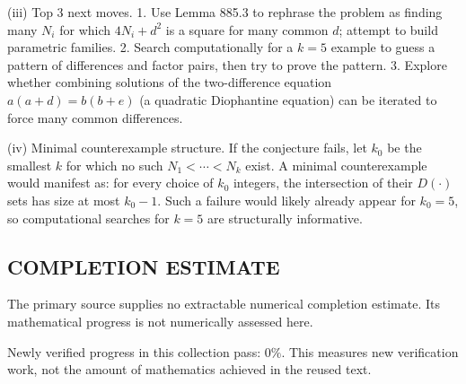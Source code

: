 (iii) Top 3 next moves.
1. Use Lemma 885.3 to rephrase the problem as finding many $N_i$ for which $4N_i+d^2$ is a square for many common $d$; attempt to build parametric families.
2. Search computationally for a $k=5$ example to guess a pattern of differences and factor pairs, then try to prove the pattern.
3. Explore whether combining solutions of the two-difference equation $a(a+d)=b(b+e)$ (a quadratic Diophantine equation) can be iterated to force many common differences.

(iv) Minimal counterexample structure.
If the conjecture fails, let $k_0$ be the smallest $k$ for which no such $N_1<\cdots<N_k$ exist. A minimal counterexample would manifest as: for every choice of $k_0$ integers, the intersection of their $D(\cdot)$ sets has size at most $k_0-1$. Such a failure would likely already appear for $k_0=5$, so computational searches for $k=5$ are structurally informative.




\subsection*{COMPLETION ESTIMATE}
The primary source supplies no extractable numerical completion estimate. Its mathematical progress is not numerically assessed here.

Newly verified progress in this collection pass: $0\%$. This measures new verification work, not the amount of mathematics achieved in the reused text.
